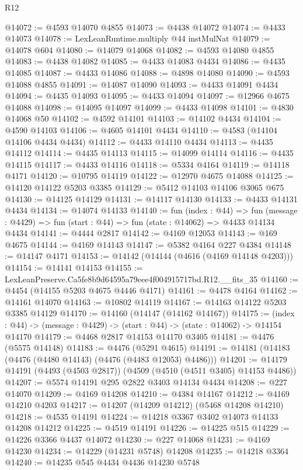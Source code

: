 \begin{lexlean}{R12}
\begin{coremodule}
@14072 := @4593 @14070 @4855
@14073 := @4438 @14072
@14074 := @4433 @14073
@14078 := LexLeanRuntime.multiply @44 instMulNat
@14079 := @14078 @604
@14080 := @14079 @14068
@14082 := @4593 @14080 @4855
@14083 := @4438 @14082
@14085 := @4433 @14083 @4434
@14086 := @4435 @14085
@14087 := @4433 @14086
@14088 := @4898 @14080
@14090 := @4593 @14088 @4855
@14091 := @14087 @14090
@14093 := @4433 @14091 @4434
@14094 := @4435 @14093
@14095 := @4433 @14094
@14097 := @12966 @4675 @14088
@14098 := @14095 @14097
@14099 := @4433 @14098
@14101 := @4830 @14068 @50
@14102 := @4592 @14101
@14103 := @14102 @4434
@14104 := @4590 @14103
@14106 := @4605 @14101 @4434
@14110 := @4583 (@14104 @14106 @4434 @4434)
@14112 := @4433 @14110 @4434
@14113 := @4435 @14112
@14114 := @4435 @14113
@14115 := @14099 @14114
@14116 := @4435 @14115
@14117 := @4433 @14116
@14118 := @5334 @4164
@14119 := @14118 @4171
@14120 := @10795 @14119
@14122 := @12970 @4675 @14088
@14125 := @14120 @14122 @5203 @3385
@14129 := @5412 @14103 @14106 @3065 @675
@14130 := @14125 @14129
@14131 := @14117 @14130
@14133 := @4433 @14131 @4434
@14134 := @14074 @14133
@14140 := fun (index : @44) =>
  fun (message : @4429) => fun (start : @44) => fun (state : @14062) => @4433 @14134 @4434
@14141 := @4444 @2817
@14142 := @4169 @12053
@14143 := @169 @4675
@14144 := @4169 @14143
@14147 := @5382 @4164 @227 @4384
@14148 := @14147 @4171
@14153 := @14142 (@14144 (@4616 (@4169 @14148 @4203)))
@14154 := @14141 @14153
@14155 := LexLeanPreserve.Ca5fe8b9d64595a79eee4f004915717bd.R12.__fits_35
@14160 := @4454 (@14155 @5203 @4675 @4446 @4171)
@14161 := @4478 @4164
@14162 := @14161 @14070
@14163 := @10802 @14119
@14167 := @14163 @14122 @5203 @3385 @14129
@14170 := @14160 (@14147 (@14162 @14167))
@14175 := (index : @44) -> (message : @4429) -> (start : @44) -> (state : @14062) -> @14154 @14170
@14179 := @4468 @2817 @14153 @14170 @3405
@14181 := @4476 (@5575 @14148)
@14183 := @4476 (@5291 @4615)
@14191 := @14181 (@14183 (@4476 (@4480 @14143) (@4476 (@4483 @12053) @4486)))
@14201 := @14179 @14191 (@4493 (@4503 @2817)) (@4509 (@4510 (@4511 @3405) @14153 @4486))
@14207 := @5574 @14191 @295 @2822 @3403 @14134 @4434
@14208 := @227 @14070
@14209 := @4169 @14208
@14210 := @4384 @14167
@14212 := @4169 @14210 @4203
@14217 := @14207 (@14209 @14212) (@5468 @14208 @14210)
@14218 := @4535 @14191
@14224 := @14218 @3367 @3402 @14073 @14133 @14208 @14212
@14225 := @4519 @14191
@14226 := @14225 @515
@14229 := @14226 @3366 @4437 @14072
@14230 := @227 @14068
@14231 := @4169 @14230
@14234 := @14229 (@14231 @5748) @14208
@14235 := @14218 @3364
@14240 := @14235 @545 @4434 @4436 @14230 @5748

\end{coremodule}
\end{lexlean}
